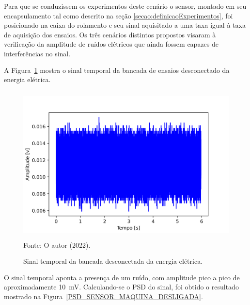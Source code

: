 \documentclass[
	12pt,				
	oneside,			
	a4paper,			
	english,			
	brazil,	
	sumario=abnt-6027-2012		
	]{abntex2ppgsi}
\begin{document}
Para que se conduzissem os experimentos deste cenário o sensor, montado em seu encapsulamento tal como descrito na seção \ref{secao:definicaoExperimentos}, foi posicionado na caixa do rolamento e seu sinal aquisitado a uma taxa igual à taxa de aquisição dos ensaios. Os três cenários distintos propostos visaram à verificação da amplitude de ruídos elétricos que ainda fossem capazes de interferências no sinal. 

A Figura~\ref{maquina_desligada_da_tomada} mostra o sinal temporal da bancada de ensaios desconectado da energia elétrica. 

\begin{figure}[H]
\centering
\caption {Sinal temporal da bancada desconectada da energia elétrica.}
\includegraphics[width=\textwidth,height=80mm,keepaspectratio]{aquisicao_01_maquina_desligada_tomada_10_03_2022_08h53min_ajustado} \\
Fonte: O autor (2022).
\label{maquina_desligada_da_tomada}
\end{figure} 

O sinal temporal aponta a presença de um ruído, com amplitude pico a pico de aproximadamente {\SI{10}{\milli\volt}}. Calculando-se o PSD do sinal, foi obtido o resultado mostrado na Figura~\ref{PSD_SENSOR_MAQUINA_DESLIGADA}. 
\end{document}
